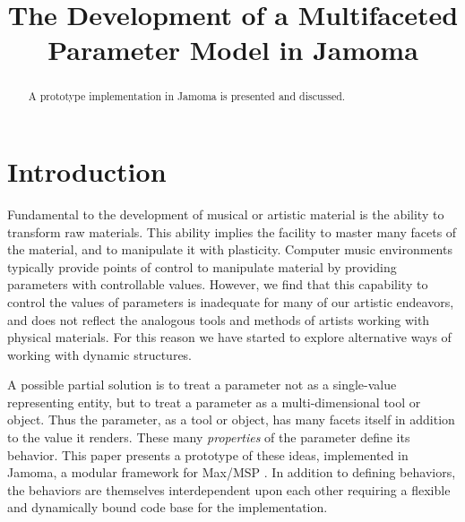 \documentclass{article}
\title{The Development of a Multifaceted Parameter Model in Jamoma}
\begin{document}
%
\maketitle
%

\begin{abstract}

A prototype implementation in Jamoma is presented and discussed.


\end{abstract}


\section{Introduction} %
\label{sec:introduction}

Fundamental to the development of musical or artistic material is the ability to transform raw materials.  This ability implies the facility to master many facets of the material, and to manipulate it with plasticity.  Computer music environments typically provide points of control to manipulate material by providing parameters with controllable values. However, we find that this capability to control the values of parameters is inadequate for many of our artistic endeavors, and does not reflect the analogous tools and methods of artists working with physical materials. For this reason we have started to explore alternative ways of working with dynamic structures.

A possible partial solution is to treat a parameter not as a single-value representing entity, but to treat a parameter as a multi-dimensional tool or object.  Thus the parameter, as a tool or object, has many facets itself in addition to the value it renders.  These many \emph{properties} of the parameter define its behavior. This paper presents a prototype of these ideas, implemented in Jamoma, a modular framework for Max/MSP \cite{Place:2006}. In addition to defining behaviors, the behaviors are themselves interdependent upon each other requiring a flexible and dynamically bound code base for the implementation.
\end{document}
